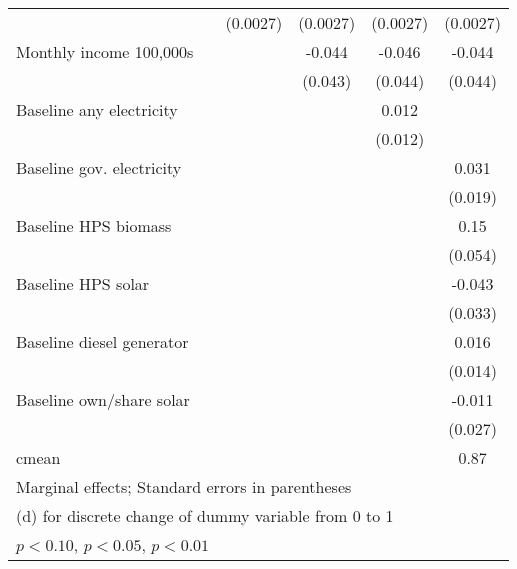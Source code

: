 \begin{table}[htbp]
\begin{tabular*}{1\hsize}{@{\hskip\tabcolsep\extracolsep\fill}l*{5}{c}}
                &                  & (0.0027)         & (0.0027)         & (0.0027)         & (0.0027)         \\
Monthly income 100,000s&                  &                  &   -0.044         &   -0.046         &   -0.044         \\
                &                  &                  &  (0.043)         &  (0.044)         &  (0.044)         \\
Baseline any electricity&                  &                  &                  &    0.012         &                  \\
                &                  &                  &                  &  (0.012)         &                  \\
Baseline gov. electricity&                  &                  &                  &                  &    0.031         \\
                &                  &                  &                  &                  &  (0.019)         \\
Baseline HPS biomass&                  &                  &                  &                  &     0.15\sym{***}\\
                &                  &                  &                  &                  &  (0.054)         \\
Baseline HPS solar&                  &                  &                  &                  &   -0.043         \\
                &                  &                  &                  &                  &  (0.033)         \\
Baseline diesel generator&                  &                  &                  &                  &    0.016         \\
                &                  &                  &                  &                  &  (0.014)         \\
Baseline own/share solar&                  &                  &                  &                  &   -0.011         \\
                &                  &                  &                  &                  &  (0.027)         \\
\midrule
cmean           &                  &                  &                  &                  &     0.87         \\
\bottomrule
\multicolumn{6}{l}{\footnotesize Marginal effects; Standard errors in parentheses}\\
\multicolumn{6}{l}{\footnotesize  (d) for discrete change of dummy variable from 0 to 1}\\
\multicolumn{6}{l}{\footnotesize \sym{*} \(p<0.10\), \sym{**} \(p<0.05\), \sym{***} \(p<0.01\)}\\
\end{tabular*}
\end{table}
